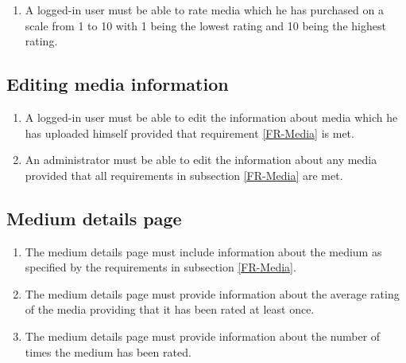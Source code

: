 \documentclass[../report.tex]{subfiles}
\begin{document}
\begin{enumerate}[label=FR-\twodigits*, resume]
	\item A logged-in user must be able to rate media which he has purchased on a scale from 1 to 10 with 1 being the lowest rating and 10 being the highest rating.
\end{enumerate}

\subsection{Editing media information}

\begin{enumerate}[label=FR-\twodigits*, resume]
	\item A logged-in user must be able to edit the information about media which he has uploaded himself provided that requirement \ref{FR-Media} is met.
	\item An administrator must be able to edit the information about any media provided that all requirements in subsection \ref{FR-Media} are met.
\end{enumerate}
			
\subsection {Medium details page}

\begin{enumerate}[label=FR-\twodigits*, resume]
	\item The medium details page must include information about the medium as specified by the requirements in subsection \ref{FR-Media}.
	\item The medium details page must provide information about the average rating of the media providing that it has been rated at least once.
	\item The medium details page must provide information about the number of times the medium has been rated.
\end{enumerate}
			

 
\end{document}
